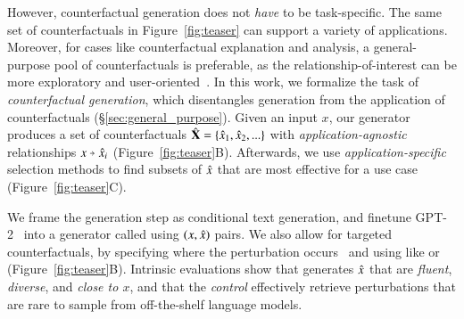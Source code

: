 % 
However, counterfactual generation does not \emph{have} to be task-specific.
The same set of counterfactuals in Figure~\ref{fig:teaser} can support a variety of applications.
Moreover, for cases like counterfactual explanation and analysis, a general-purpose pool of counterfactuals is preferable, as the relationship-of-interest can be more exploratory and user-oriented~\cite{wu2019errudite}.
In this work, we formalize the task of \emph{counterfactual generation}, which disentangles generation from the application of counterfactuals (\S\ref{sec:general_purpose}).
Given an input $x$, our generator produces a set of counterfactuals $\hat{\mathbf{X}} = \{\hat{x}_1, \hat{x}_2, ...\}$ with \emph{application-agnostic} relationships $x \veryshortarrow \xp_i$ (Figure~\ref{fig:teaser}B).
Afterwards, we use \emph{application-specific} selection methods to find subsets of $\hat{x}$ that are most effective for a use case (Figure~\ref{fig:teaser}C).

We frame the generation step as conditional text generation, and finetune GPT-2~\cite{radford2019language} into a generator called \emph{\sysname} using $(x, \hat{x})$ pairs. 
We also allow for targeted counterfactuals, by specifying where the perturbation occurs~\cite{donahue2020enabling} and using \tagstrs like  or  (Figure~\ref{fig:teaser}B).
Intrinsic evaluations show that \sysname generates $\hat{x}$ that are \emph{fluent}, \emph{diverse}, and \emph{close to $x$}, and that the \emph{control} effectively retrieve perturbations that are rare to sample from off-the-shelf language models. %

